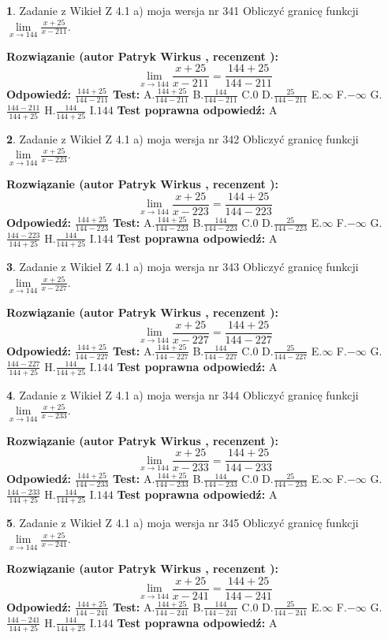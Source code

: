 \documentclass[12pt, a4paper]{article}
\theoremstyle{definition} %
\newtheorem{zad}{}
\newcommand{\zadStart}[1]{\begin{zad}#1\newline}
\newcommand{\zadStop}{\end{zad}}
\newcommand{\rozwStart}[2]{\noindent \textbf{Rozwiązanie (autor #1 , recenzent #2): }\newline}
\newcommand{\rozwStop}{\newline}
\newcommand{\odpStart}{\noindent \textbf{Odpowiedź:}\newline}
\newcommand{\odpStop}{\newline}
\newcommand{\testStart}{\noindent \textbf{Test:}\newline}
\newcommand{\testStop}{\newline}
\newcommand{\kluczStart}{\noindent \textbf{Test poprawna odpowiedź:}\newline}
\newcommand{\kluczStop}{\newline}
\begin{document}
\zadStart{Zadanie z Wikieł Z 4.1 a) moja wersja nr 341}
Obliczyć granicę funkcji $\lim\limits_{x\to144}\frac{x+25}{x-211}$.
\zadStop
\rozwStart{Patryk Wirkus}{}
$$\lim\limits_{x\to144}\frac{x+25}{x-211} = \frac{144+25}{144-211}$$
\rozwStop
\odpStart
$\frac{144+25}{144-211}$
\odpStop
\testStart
A.$\frac{144+25}{144-211}$
B.$\frac{144}{144-211}$
C.$0$
D.$\frac{25}{144-211}$
E.$\infty$
F.$-\infty$
G.$\frac{144-211}{144+25}$
H.$\frac{144}{144+25}$
I.$144$
\testStop
\kluczStart
A
\kluczStop



\zadStart{Zadanie z Wikieł Z 4.1 a) moja wersja nr 342}
Obliczyć granicę funkcji $\lim\limits_{x\to144}\frac{x+25}{x-223}$.
\zadStop
\rozwStart{Patryk Wirkus}{}
$$\lim\limits_{x\to144}\frac{x+25}{x-223} = \frac{144+25}{144-223}$$
\rozwStop
\odpStart
$\frac{144+25}{144-223}$
\odpStop
\testStart
A.$\frac{144+25}{144-223}$
B.$\frac{144}{144-223}$
C.$0$
D.$\frac{25}{144-223}$
E.$\infty$
F.$-\infty$
G.$\frac{144-223}{144+25}$
H.$\frac{144}{144+25}$
I.$144$
\testStop
\kluczStart
A
\kluczStop



\zadStart{Zadanie z Wikieł Z 4.1 a) moja wersja nr 343}
Obliczyć granicę funkcji $\lim\limits_{x\to144}\frac{x+25}{x-227}$.
\zadStop
\rozwStart{Patryk Wirkus}{}
$$\lim\limits_{x\to144}\frac{x+25}{x-227} = \frac{144+25}{144-227}$$
\rozwStop
\odpStart
$\frac{144+25}{144-227}$
\odpStop
\testStart
A.$\frac{144+25}{144-227}$
B.$\frac{144}{144-227}$
C.$0$
D.$\frac{25}{144-227}$
E.$\infty$
F.$-\infty$
G.$\frac{144-227}{144+25}$
H.$\frac{144}{144+25}$
I.$144$
\testStop
\kluczStart
A
\kluczStop



\zadStart{Zadanie z Wikieł Z 4.1 a) moja wersja nr 344}
Obliczyć granicę funkcji $\lim\limits_{x\to144}\frac{x+25}{x-233}$.
\zadStop
\rozwStart{Patryk Wirkus}{}
$$\lim\limits_{x\to144}\frac{x+25}{x-233} = \frac{144+25}{144-233}$$
\rozwStop
\odpStart
$\frac{144+25}{144-233}$
\odpStop
\testStart
A.$\frac{144+25}{144-233}$
B.$\frac{144}{144-233}$
C.$0$
D.$\frac{25}{144-233}$
E.$\infty$
F.$-\infty$
G.$\frac{144-233}{144+25}$
H.$\frac{144}{144+25}$
I.$144$
\testStop
\kluczStart
A
\kluczStop



\zadStart{Zadanie z Wikieł Z 4.1 a) moja wersja nr 345}
Obliczyć granicę funkcji $\lim\limits_{x\to144}\frac{x+25}{x-241}$.
\zadStop
\rozwStart{Patryk Wirkus}{}
$$\lim\limits_{x\to144}\frac{x+25}{x-241} = \frac{144+25}{144-241}$$
\rozwStop
\odpStart
$\frac{144+25}{144-241}$
\odpStop
\testStart
A.$\frac{144+25}{144-241}$
B.$\frac{144}{144-241}$
C.$0$
D.$\frac{25}{144-241}$
E.$\infty$
F.$-\infty$
G.$\frac{144-241}{144+25}$
H.$\frac{144}{144+25}$
I.$144$
\testStop
\kluczStart
A
\kluczStop
\end{document}

